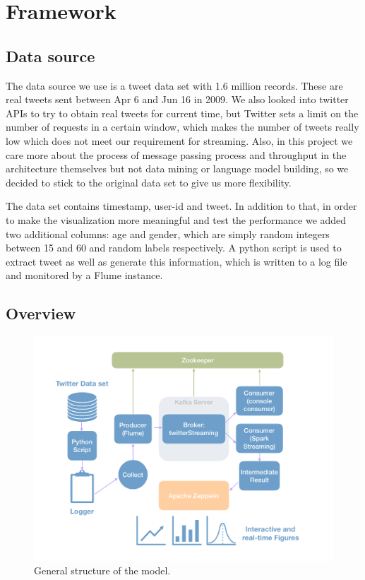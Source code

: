\documentclass[manuscript, review, screen]{acmart}
\begin{document}
\section{Framework}

\subsection{Data source}
The data source we use is a tweet data set with 1.6 million records. These are real tweets sent between Apr 6 and Jun 16 in 2009. We also looked into twitter APIs to try to obtain real tweets for current time, but Twitter sets a limit on the number of requests in a certain window, which makes the number of tweets really low which does not meet our requirement for streaming. Also, in this project we care more about the process of message passing process and throughput in the architecture themselves but not data mining or language model building, so we decided to stick to the original data set to give us more flexibility. 

The data set contains timestamp, user-id and tweet. In addition to that, in order to make the visualization more meaningful and test the performance we added two additional columns: age and gender, which are simply random integers between 15 and 60 and random labels respectively. A python script is used to extract tweet as well as generate this information, which is written to a log file and monitored by a Flume instance. 

\subsection{Overview}

\begin{figure}
    \centering
    \includegraphics[width=\textwidth]{arch.pdf}
    \caption{General structure of the model.}
    \label{fig:arch}
\end{figure}
\end{document}
